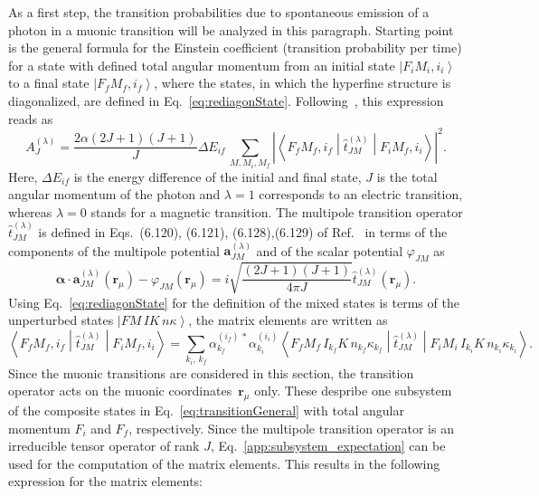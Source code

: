 As a first step, the transition probabilities due to spontaneous emission of a photon in a muonic transition will be analyzed in this paragraph. Starting point is the general formula for the Einstein coefficient (transition probability per time) for a state with defined total angular momentum from an initial state $\left|F_iM_i,i_i\right>$ to a final state $\left|F_fM_f,i_f\right>$, where the states, in which the hyperfine structure is diagonalized, are defined in Eq.~\eqref{eq:rediagonState}. Following~\cite[Section 6.]{johnson2007}, this expression reads as
\begin{equation}
\label{eq:transitionGeneral}
A^{(\lambda)}_{J}=\frac{2\alpha (2J+1)(J+1)}{J}\Delta E_{if}\,\sum_{M,M_i,M_f} \left|\left<F_fM_f,i_f\middle|\hat{t}^{(\lambda)}_{JM}\middle|F_iM_f,i_i\right>\right|^2.
\end{equation}
Here, $\Delta E_{if}$ is the energy difference of the initial and final state, $J$ is the total angular momentum of the photon and $\lambda=1$ corresponds to an electric transition, whereas $\lambda=0$ stands for a magnetic transition. The multipole transition operator $\hat{t}^{(\lambda)}_{JM}$ is defined in Eqs.~(6.120), (6.121), (6.128),(6.129) of Ref.~\cite{johnson2007} in terms of the components of the multipole potential $\mathbf{a}^{(\lambda)}_{JM}$ and of the scalar potential $\varphi_{JM}$ as
\begin{equation}
\boldsymbol{\alpha}\cdot \mathbf{a}^{(\lambda)}_{JM}(\mathbf{r}_\mu) - \varphi_{JM}(\mathbf{r}_\mu) = i\sqrt{\frac{(2J+1)(J+1)}{4\pi J}}\hat{t}^{(\lambda)}_{JM}(\mathbf{r}_\mu).
\end{equation}
Using Eq.~\eqref{eq:rediagonState} for the definition of the mixed states is terms of the unperturbed states $\left| FM\,IK\,n\kappa\right>$, the matrix elements are written as
\begin{equation}
\label{eq:tranElement1}
\left<F_fM_f,i_f\middle|\hat{t}^{(\lambda)}_{JM}\middle|F_iM_f,i_i\right> =
\sum_{k_i,\,k_f}\alpha^{(i_f)\,*}_{k_f} \alpha^{(i_i)}_{k_i}\left<F_fM_f\,I_{k_f}K\,n_{k_f}\kappa_{k_f} \middle|\hat{t}^{(\lambda)}_{JM}\middle|F_iM_i\,I_{k_i}K\,n_{k_i}\kappa_{k_i}\right>.
\end{equation}
Since the muonic transitions are considered in this section, the transition operator acts on the muonic coordinates~$\mathbf{r}_\mu$ only. These despribe one subsystem of the composite states in Eq.~\eqref{eq:transitionGeneral} with total angular momentum $F_i$ and $F_f$, respectively. Since the multipole transition operator is an irreducible tensor operator of rank $J$, Eq.~\eqref{app:subsystem_expectation} can be used for the computation of the matrix elements. This results in the following expression for the matrix elements:
